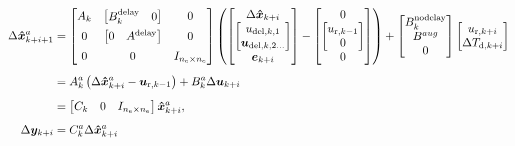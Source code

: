\begin{equation}
  \begin{split}
    \Delta \bm{\hat{x}}_{k+i+1}^a     & =
    \begin{bmatrix}
      A_k & \begin{bmatrix}B_k^\text{delay} & 0\end{bmatrix} & 0 \\[0.5em]
      0 & \begin{bmatrix} 0 & A^\text{delay} \end{bmatrix} & 0\\[0.5em]
      0 & 0 & I_{n_\text{e}\times n_\text{e}}
    \end{bmatrix}
    \left(\begin{bmatrix}
      \Delta \bm{\hat{x}}_{k+i}\\
      \begin{bmatrix}
        u_{\text{del},k,1}\\
        \bm{u}_{\text{del},k,2\ldots}\\
      \end{bmatrix}\\
      \bm{e}_{k+i}
    \end{bmatrix} -
    \begin{bmatrix}
      0\\
      \begin{bmatrix}
        u_{\text{r},k-1}\\
        0\\
      \end{bmatrix}\\
      0
    \end{bmatrix}
    \right) + 
    \begin{bmatrix}
      B_k^\text{nodelay}\\
      B^{aug}\\
      0
    \end{bmatrix}
    \begin{bmatrix}
      u_{\text{r},k+i}\\
      \Delta T_{\text{d},k+i}
    \end{bmatrix}\\[0.5em]
    & = A_k^a \left(\Delta \bm{\hat{x}}_{k+i}^a - \bm{u}_{\text{r},k-1}\right) + B_k^a \Delta \bm{u}_{k+i}\\[0.5em]
    & = \begin{bmatrix}
      C_k & 0 & I_{n_\text{e} \times n_\text{e}}
    \end{bmatrix}
    \bm{\hat{x}}_{k+i}^a,\\[0.5em]
    \Delta \bm{y}_{k+i} & = C_k^a \Delta \bm{\hat{x}}_{k+i}^a\\[0.5em]
  \end{split}
  \label{eq:mpc:augmented-state-eqs}
\end{equation}

